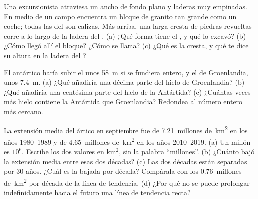 \begin{exercise}[$\star\star$]\label{exo:g8:ice-on-earth:9}
Una excursionista atraviesa un  ancho de fondo plano y laderas muy
empinadas. En medio de un campo encuentra un bloque de granito tan grande
como un coche; todas las  del  son calizas. Más arriba, una larga
cresta de piedras revueltas corre a lo largo de la ladera del .
(a) ¿Qué forma tiene el , y qué lo excavó? (b) ¿Cómo llegó allí el
bloque? ¿Cómo se llama? (c) ¿Qué es la cresta, y qué te dice su altura en
la ladera del ?
\end{exercise}

\begin{exercise}[$\star\star$]\label{exo:g8:ice-on-earth:10}
El  antártico haría subir el  unos \qty{58}{m} si se
fundiera entero, y el  de Groenlandia, unos \qty{7.4}{m}. (a) ¿Qué
añadiría una décima parte del hielo de Groenlandia? (b) ¿Qué añadiría una
centésima parte del hielo de la Antártida? (c) ¿Cuántas veces más hielo
contiene la Antártida que Groenlandia? Redondea al número entero más
cercano.
\end{exercise}

\begin{exercise}[$\star\star\star$]\label{exo:g8:ice-on-earth:11}
La extensión media del  ártico en septiembre fue de
\num{7.21}~millones de~\unit{km^2} en los años 1980--1989 y de
\num{4.65}~millones de~\unit{km^2} en los años 2010--2019. (a) Un millón es
$10^6$. Escribe los dos valores en km$^2$, sin la palabra ``millones''.
(b) ¿Cuánto bajó la extensión media entre esas dos décadas? (c) Las dos
décadas están separadas por 30 años. ¿Cuál es la bajada por década?
Compárala con los \num{0.76}~millones de~\unit{km^2} por década de la línea
de tendencia. (d) ¿Por qué no se puede prolongar indefinidamente hacia el
futuro una línea de tendencia recta?
\end{exercise}

